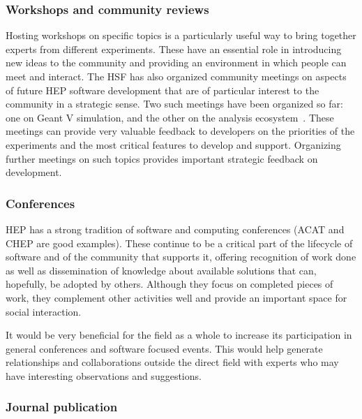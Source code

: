 \documentclass[12pt,a4paper]{article}
\begin{document}
\hypertarget{workshops-and-community-reviews}{%
\subsubsection{Workshops and community
reviews}\label{workshops-and-community-reviews}}

Hosting workshops on specific topics is a particularly useful way to
bring together experts from different experiments. These have an
essential role in introducing new ideas to the community and providing
an environment in which people can meet and interact. The HSF has also
organized community meetings on aspects of future HEP software
development that are of particular interest to the community in a
strategic sense. Two such meetings have been organized so far: one on
Geant V simulation\cite{HSF-GeantV-Report}, and the other on the analysis
ecosystem~\cite{HSF-Analysis-Report}. These meetings can provide very valuable
feedback to developers on the priorities of the experiments and the most
critical features to develop and support. Organizing further meetings on such topics provides
important strategic feedback on development.

\hypertarget{conferences}{%
\subsubsection{Conferences}\label{conferences}}

HEP has a strong tradition of software and computing conferences (ACAT
and CHEP are good examples). These continue to be a critical part of the
lifecycle of software and of the community that supports it, offering
recognition of work done as well as dissemination of knowledge about
available solutions that can, hopefully, be adopted by others. Although
they focus on completed pieces of work, they complement other activities
well and provide an important space for social interaction.

It would be very beneficial for the field as a whole to increase its
participation in general conferences and software focused events. This
would help generate relationships and collaborations outside the direct
field with experts who may have interesting observations and
suggestions.

\hypertarget{journal-publication}{%
\subsubsection{Journal publication}\label{journal-publication}}
\end{document}
